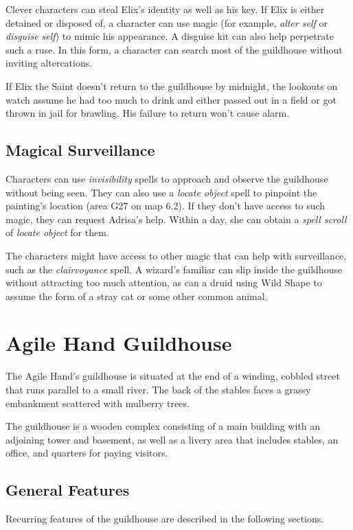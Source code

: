 \documentclass[10pt,a4paper,twoside,bg=print,twocolumn,openany,nodeprecatedcode]{dndbook}
\begin{document}
Clever characters can steal Elix's identity as well as his key. If Elix is either detained or disposed of, a character can use magic (for example, \textit{alter self} or \textit{disguise self}) to mimic his appearance. A disguise kit can also help perpetrate such a ruse. In this form, a character can search most of the guildhouse without inviting altercations.

If Elix the Saint doesn't return to the guildhouse by midnight, the lookouts on watch assume he had too much to drink and either passed out in a field or got thrown in jail for brawling. His failure to return won't cause alarm.

\subsection{Magical Surveillance}
Characters can use \textit{invisibility} spells to approach and observe the guildhouse without being seen. They can also use a \textit{locate object} spell to pinpoint the painting's location (area G27 on map 6.2). If they don't have access to such magic, they can request Adrisa's help. Within a day, she can obtain a \textit{spell scroll} of \textit{locate object} for them.

The characters might have access to other magic that can help with surveillance, such as the \textit{clairvoyance} spell. A wizard's familiar can slip inside the guildhouse without attracting too much attention, as can a druid using Wild Shape to assume the form of a stray cat or some other common animal.

\section{Agile Hand Guildhouse}
The Agile Hand's guildhouse is situated at the end of a winding, cobbled street that runs parallel to a small river. The back of the stables faces a grassy embankment scattered with mulberry trees.

The guildhouse is a wooden complex consisting of a main building with an adjoining tower and basement, as well as a livery area that includes stables, an office, and quarters for paying visitors.

\subsection{General Features}
Recurring features of the guildhouse are described in the following sections.
\end{document}
